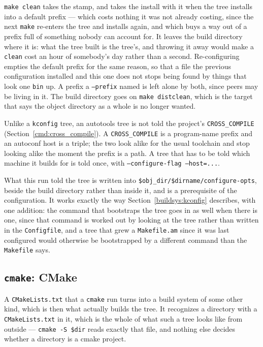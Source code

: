 \documentclass{article}
\begin{document}
\texttt{make clean} takes the stamp, and takes the install with it
when the tree installs into a default prefix --- which costs nothing
it was not already costing, since the next \texttt{make} re-enters the tree and
installs again, and which buys a way out of a prefix full of something
nobody can account for.  It leaves the build directory where it is:
what the tree built is the tree's, and throwing it away would make a
\texttt{clean} cost an hour of somebody's day rather than a second.
Re-configuring empties the default prefix for the same reason, so that
a file the previous configuration installed and this one does not stops
being found by things that look one \texttt{bin} up.  A prefix a
\texttt{--prefix} named is left alone by both, since peers may be
living in it.  The build directory goes on \texttt{make distclean},
which is the target that says the object directory as a whole is no
longer wanted.

Unlike a \texttt{kconfig} tree, an autotools tree is not told the
project's \texttt{CROSS\_COMPILE} (Section~\ref{cmd:cross_compile}).
A \texttt{CROSS\_COMPILE} is a program-name prefix and an autoconf host
is a triple; the two look alike for the usual toolchain and stop
looking alike the moment the prefix is a path.  A tree that has to be
told which machine it builds for is told once, with
\texttt{--configure-flag --host=...}.

What this run told the tree is written into
\texttt{\$obj\_dir/\$dirname/configure-opts}, beside the build
directory rather than inside it, and is a prerequisite of the
configuration.  It works exactly the way
Section~\ref{buildsys:kconfig} describes, with one addition: the
command that bootstraps the tree goes in as well when there is one,
since that command is worked out by looking at the tree rather than
written in the \texttt{Configfile}, and a tree that grew a
\texttt{Makefile.am} since it was last configured would otherwise be
bootstrapped by a different command than the \texttt{Makefile} says.

\subsection{\texttt{cmake}: CMake \label{buildsys:cmake}}

A \texttt{CMakeLists.txt} that a \texttt{cmake} run turns into a build
system of some other kind, which is then what actually builds the
tree.  It recognizes a directory with a \texttt{CMakeLists.txt} in it,
which is the whole of what such a tree looks like from outside ---
\texttt{cmake -S \$dir} reads exactly that file, and nothing else
decides whether a directory is a cmake project.
\end{document}
